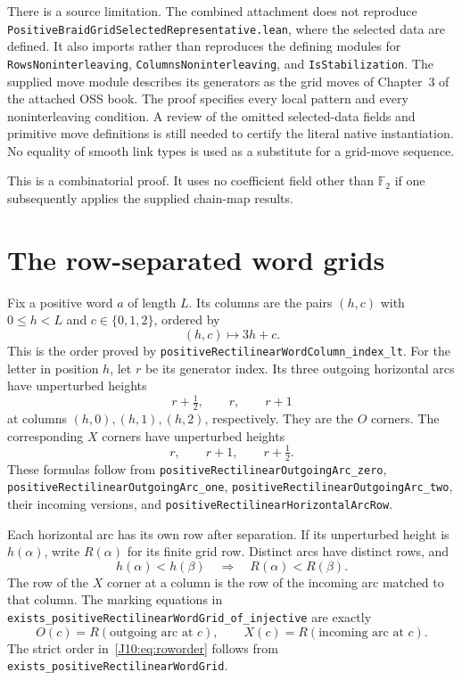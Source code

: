 \documentclass[11pt,oneside]{report}
\theoremstyle{definition}
\numberwithin{equation}{section}
\newcommand{\F}{\mathbb F_2}
\newcommand{\decl}[1]{\textnormal{\nolinkurl{#1}}}
\begin{document}
There is a source limitation. The combined attachment does not reproduce
\nolinkurl{PositiveBraidGridSelectedRepresentative.lean}, where the selected
data are defined. It also imports rather than reproduces the defining
modules for \decl{RowsNoninterleaving}, \decl{ColumnsNoninterleaving},
and \decl{IsStabilization}. The supplied move module describes its
generators as the grid moves of Chapter~3 of the attached OSS book.
The proof specifies every local pattern and every noninterleaving
condition. A review of the omitted selected-data fields and primitive
move definitions is still needed to certify the literal native
instantiation. No equality of smooth link types is used as a substitute
for a grid-move sequence.

This is a combinatorial proof. It uses no coefficient field other than
$\F$ if one subsequently applies the supplied chain-map results.

\section{The row-separated word grids}

Fix a positive word $a$ of length $L$. Its columns are the pairs
$(h,c)$ with $0\le h<L$ and $c\in\{0,1,2\}$, ordered by
\begin{equation}\label{J10:eq:columns}
 (h,c)\longmapsto 3h+c.
\end{equation}
This is the order proved by
\decl{positiveRectilinearWordColumn_index_lt}.
For the letter in position $h$, let $r$ be its generator index.
Its three outgoing horizontal arcs have unperturbed heights
\[
 r+\tfrac12,\qquad r,\qquad r+1
\]
at columns $(h,0),(h,1),(h,2)$, respectively.
They are the $O$ corners. The corresponding $X$ corners have
unperturbed heights
\[
 r,\qquad r+1,\qquad r+\tfrac12.
\]
These formulas follow from
\decl{positiveRectilinearOutgoingArc_zero},
\decl{positiveRectilinearOutgoingArc_one},
\decl{positiveRectilinearOutgoingArc_two}, their incoming versions,
and \decl{positiveRectilinearHorizontalArcRow}.

Each horizontal arc has its own row after separation.
If its unperturbed height is $h(\alpha)$, write $R(\alpha)$ for its
finite grid row. Distinct arcs have distinct rows, and
\begin{equation}\label{J10:eq:roworder}
 h(\alpha)<h(\beta)\quad\Longrightarrow\quad
 R(\alpha)<R(\beta).
\end{equation}
The row of the $X$ corner at a column is the row of the incoming arc
matched to that column. The marking equations in
\decl{exists_positiveRectilinearWordGrid_of_injective} are exactly
\begin{equation}\label{J10:eq:markings}
 O(c)=R(\text{outgoing arc at }c),\qquad
 X(c)=R(\text{incoming arc at }c).
\end{equation}
The strict order in~\eqref{J10:eq:roworder} follows from
\decl{exists_positiveRectilinearWordGrid}.
\end{document}
